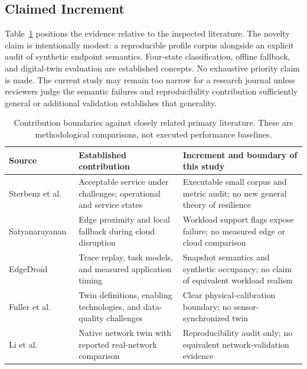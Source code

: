\subsection{Claimed Increment}
Table~\ref{tab:novelty} positions the evidence relative to the inspected literature. The novelty claim is intentionally modest: a reproducible profile corpus alongside an explicit audit of synthetic endpoint semantics. Four-state classification, offline fallback, and digital-twin evaluation are established concepts. No exhaustive priority claim is made. The current study may remain too narrow for a research journal unless reviewers judge the semantic failures and reproducibility contribution sufficiently general or additional validation establishes that generality.

\begin{table}[t]
\centering\caption{Contribution boundaries against closely related primary literature. These are methodological comparisons, not executed performance baselines.}\label{tab:novelty}
\small\begin{tabular}{p{}p{}p{}}\toprule
Source & Established contribution & Increment and boundary of this study \\\midrule
Sterbenz et al.~\cite{sterbenz2010} & Acceptable service under challenges; operational and service states & Executable small corpus and metric audit; no new general theory of resilience \\
Satyanarayanan~\cite{satyanarayanan2017} & Edge proximity and local fallback during cloud disruption & Workload support flags expose failure; no measured edge or cloud comparison \\
EdgeDroid~\cite{olguin2019} & Trace replay, task models, and measured application timing & Snapshot semantics and synthetic occupancy; no claim of equivalent workload realism \\
Fuller et al.~\cite{fuller2020} & Twin definitions, enabling technologies, and data-quality challenges & Clear physical-calibration boundary; no sensor-synchronized twin \\
Li et al.~\cite{li2025} & Native network twin with reported real-network comparison & Reproducibility audit only; no equivalent network-validation evidence \\
\bottomrule\end{tabular}
\end{table}
